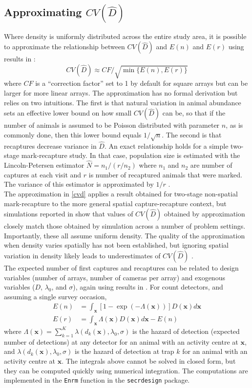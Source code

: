 \documentclass[a4paper,11pt, draft]{article} %
\begin{document}
\subsection{Approximating $CV(\hat{D})$} \label{s:cvapprox}
Where density is uniformly distributed across the entire study area, it is possible to approximate the relationship between $CV(\hat{D})$ and $E(n)$ and $E(r)$ using results in \cite{Efford2019}: 
\begin{equation} \label{cvd}
CV(\hat{D}) \approx CF/\sqrt{\min\{E(n),E(r)\}}
\end{equation} where $CF$ is a ``correction factor'' set to 1 by default for square arrays but can be larger for more linear arrays. The approximation has no formal derivation but relies on two intuitions. The first is that natural variation in animal abundance sets an effective lower bound on how small $CV(\hat{D})$ can be, so that if the number of animals is assumed to be Poisson distributed with parameter $n$, as is commonly done, then this lower bound equals $1/\sqrt{n}$. The second is that recaptures decrease variance in $\hat{D}$. An exact relationship holds for a simple two-stage mark-recapture study. In that case, population size is estimated with the Lincoln-Petersen estimator $\hat{N}=n_1/(r/n_2)$ where $n_1$ and $n_2$ are number of captures at each visit and $r$ is number of recaptured animals that were marked. The variance of this estimator is approximated by $1/r$ \citep{Seber1982}. 
\\[1em]
The approximation in \eqref{cvd} applies a result obtained for two-stage non-spatial mark-recapture to the more general spatial capture-recapture context, but simulations reported in \cite{Efford2019} show that values of $CV(\hat{D})$ obtained by approximation closely match those obtained by simulation across a number of problem settings. Importantly, these all assume uniform density. The quality of the approximation when density varies spatially has not been established, but ignoring spatial variation in density likely leads to underestimates of $CV(\hat{D})$ \citep{Efford2019}.
\\[1em]
The expected number of first captures and recaptures can be related to design variables (number of arrays, number of cameras per array) and exogenous variables ($D$, $\lambda_0$, and $\sigma$), again using results in \cite{Efford2019}. For count detectors, and assuming a single survey occasion,
\begin{align}
E(n) &= \int_{\mathbf x} [1-\exp(-\Lambda(\mathbf x))] D(\mathbf x) d\mathbf{x} \\
E(r) &= \int_{\mathbf x} \Lambda(\mathbf x) D(\mathbf x) d\mathbf{x} - E(n)
\end{align}
where $\Lambda(\mathbf{x})=\sum_{k=1}^K \lambda(d_k(\mathbf{x}),\lambda_0,\sigma)$ is the hazard of detection (expected number of detections) at any detector for an animal with an activity centre at $\mathbf{x}$, and $\lambda(d_k(\mathbf{x}),\lambda_0,\sigma)$ is the hazard of detection at trap $k$ for an animal with an activity centre at $\mathbf{x}$. The integrals above cannot be solved in closed form, but they can be computed quickly using numerical integration. The computations are implemented in the \texttt{Enrm} function in the \texttt{secrdesign} package.
\end{document}
